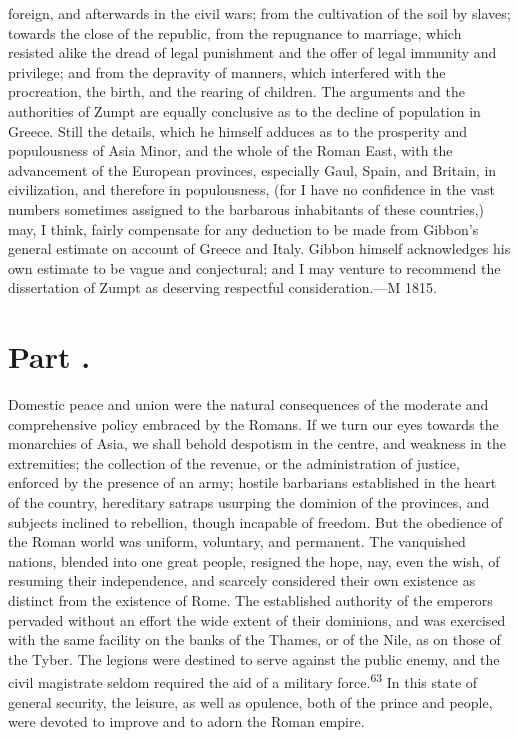 {foreign, and afterwards in the civil wars; from the cultivation
of the soil by slaves; towards the close of the republic, from
the repugnance to marriage, which resisted alike the dread of
legal punishment and the offer of legal immunity and privilege;
and from the depravity of manners, which interfered with the
procreation, the birth, and the rearing of children. The
arguments and the authorities of Zumpt are equally conclusive as
to the decline of population in Greece. Still the details, which
he himself adduces as to the prosperity and populousness of Asia
Minor, and the whole of the Roman East, with the advancement of
the European provinces, especially Gaul, Spain, and Britain, in
civilization, and therefore in populousness, (for I have no
confidence in the vast numbers sometimes assigned to the
barbarous inhabitants of these countries,) may, I think, fairly
compensate for any deduction to be made from Gibbon’s general
estimate on account of Greece and Italy. Gibbon himself
acknowledges his own estimate to be vague and conjectural; and I
may venture to recommend the dissertation of Zumpt as deserving
respectful consideration.—M 1815.}

\section{Part \thesection.}

Domestic peace and union were the natural consequences of the
moderate and comprehensive policy embraced by the Romans. If we
turn our eyes towards the monarchies of Asia, we shall behold
despotism in the centre, and weakness in the extremities; the
collection of the revenue, or the administration of justice,
enforced by the presence of an army; hostile barbarians
established in the heart of the country, hereditary satraps
usurping the dominion of the provinces, and subjects inclined to
rebellion, though incapable of freedom. But the obedience of the
Roman world was uniform, voluntary, and permanent. The vanquished
nations, blended into one great people, resigned the hope, nay,
even the wish, of resuming their independence, and scarcely
considered their own existence as distinct from the existence of
Rome. The established authority of the emperors pervaded without
an effort the wide extent of their dominions, and was exercised
with the same facility on the banks of the Thames, or of the
Nile, as on those of the Tyber. The legions were destined to
serve against the public enemy, and the civil magistrate seldom
required the aid of a military force.\textsuperscript{63} In this state of general
security, the leisure, as well as opulence, both of the prince
and people, were devoted to improve and to adorn the Roman
empire.

